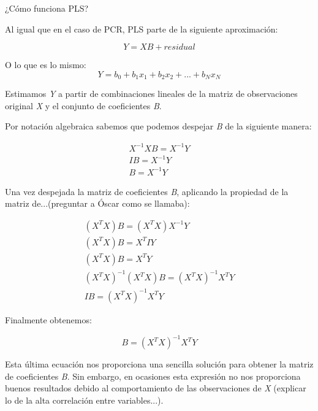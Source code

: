 \documentclass[12pt,a4paper,Spanish]{book}
\begin{document}
¿Cómo funciona PLS?

Al igual que en el caso de PCR, PLS parte de la siguiente aproximación:

\begin{equation}
Y = XB+residual
\end{equation}

O lo que es lo mismo:
\begin{equation}
Y = b_0 + b_1x_1 + b_2x_2 + ... + b_Nx_N
\end{equation}


Estimamos \textit{Y} a partir de combinaciones lineales de la matriz de observaciones original \textit{X} y el conjunto de coeficientes \textit{B}.

Por notación algebraica sabemos que podemos despejar \textit{B} de la siguiente manera:

\begin{equation}
\begin{split} 
X^{-1}XB=X^{-1}Y\\
IB=X^{-1}Y\\
B=X^{-1}Y
\end{split} 
\end{equation}

Una vez despejada la matriz de coeficientes \textit{B}, aplicando la propiedad de la matriz de...(preguntar a Óscar como se llamaba):

\begin{equation}
\begin{split} 
(X^{T} X) B = (X^{T} X) X^{-1} Y \\
(X^{T} X) B = X^{T} I Y \\
(X^{T} X) B = X^{T} Y \\
(X^{T} X)^{-1} (X^{T}X) B = (X^{T} X)^{-1} X^{T} Y \\
I B = (X^{T} X)^{-1} X^{T} Y 
\end{split} 
\end{equation}

Finalmente obtenemos: 

\begin{equation}
B = (X^{T} X)^{-1} X^{T} Y
\end{equation}

Esta última ecuación nos proporciona una sencilla solución para obtener la matriz de coeficientes \textit{B}. Sin embargo, en ocasiones esta expresión no nos proporciona buenos resultados debido al comportamiento de las observaciones de \textit{X} (explicar lo de la alta correlación entre variables...).
\end{document}
